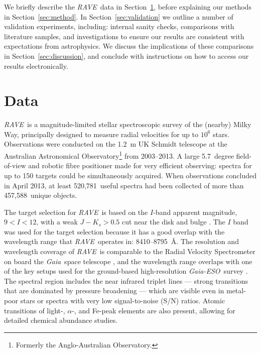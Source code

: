 \documentclass[preprint]{aastex61}
\newcommand{\acronym}[1]{{\small{#1}}}
\newcommand{\project}[1]{\textsl{#1}}
\newcommand{\gaia}{\project{Gaia}}
\newcommand{\rave}{\project{\acronym{RAVE}}}
\newcommand{\ges}{\project{Gaia-ESO}}
\newcommand{\Nspectra}{520,781}
\newcommand{\Nstars}{457,588}
\begin{document}
We briefly describe the \rave\ data in Section~\ref{sec:data}, before explaining
our methods in Section~\ref{sec:method}.  In Section~\ref{sec:validation}
we outline a number of validation experiments, including: internal sanity checks,
comparisons with literature samples, and investigations to ensure our results
are consistent with expectations from astrophysics.  We discuss the implications
of these comparisons in Section~\ref{sec:discussion}, and conclude with instructions
on how to access our results electronically.


\section{Data}
\label{sec:data}


\rave\ is a magnitude-limited stellar spectroscopic survey of the (nearby) Milky Way,
principally designed to measure radial velocities for up to $10^6$ stars.
Observations were conducted on the 1.2~m UK Schmidt telescope at the Australian 
Astronomical Observatory\footnote{Formerly the Anglo-Australian Observatory.} from 
2003--2013.  A large 5.7~degree field-of-view and robotic fibre positioner made for 
very efficient observing:  spectra for up to 150 targets could be simultaneously
acquired.  When observations concluded in April 2013, at least \Nspectra\ useful 
spectra had been collected of more than \Nstars\ unique objects. 


The target selection for \rave\ is based on the $I$-band apparent magnitude,
$9 < I < 12$, with a weak $J - K_s > 0.5$ cut near the disk and bulge \citep{Wojno_2016}.  
The $I$ band was used for the target selection because it has a good overlap with the
wavelength range that \rave\ operates in:  8410--8795~\AA.  The resolution and 
wavelength coverage of \rave\ is comparable to the Radial Velocity Spectrometer on
board the \gaia\ space telescope \citep{Munari_2005,Kordopatis_2011},
and the wavelength range overlaps with one of the key setups used for the ground-based 
high-resolution \ges\ survey \citep{Gilmore_2012,Randich_2013}.  The spectral region 
includes the  near infrared triplet lines --- strong transitions that 
are dominated by pressure broadening --- which are visible even in metal-poor stars
or spectra with very low signal-to-noise (S/N) ratios.  Atomic transitions of 
light-, $\alpha$-, and Fe-peak elements are also present, allowing for detailed 
chemical abundance studies.
\end{document}
